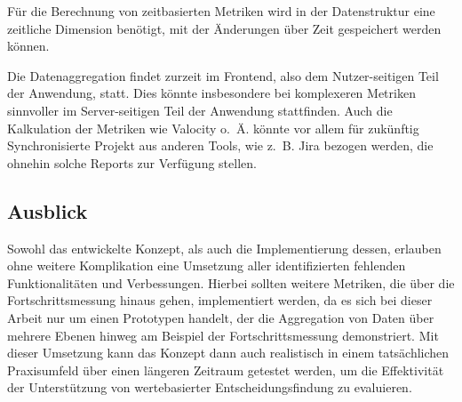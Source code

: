 Für die Berechnung von zeitbasierten Metriken wird in der Datenstruktur eine zeitliche Dimension benötigt, mit der Änderungen über Zeit gespeichert werden können.

Die Datenaggregation findet zurzeit im Frontend, also dem Nutzer-seitigen Teil der Anwendung, statt. Dies könnte insbesondere bei komplexeren Metriken sinnvoller im Server-seitigen Teil der Anwendung stattfinden. Auch die Kalkulation der Metriken wie Valocity o. Ä. könnte vor allem für zukünftig Synchronisierte Projekt aus anderen Tools, wie z. B. Jira bezogen werden, die ohnehin solche Reports zur Verfügung stellen.

\subsection{Ausblick}
Sowohl das entwickelte Konzept, als auch die Implementierung dessen, erlauben ohne weitere Komplikation eine Umsetzung aller identifizierten fehlenden Funktionalitäten und Verbessungen. Hierbei sollten weitere Metriken, die über die Fortschrittsmessung hinaus gehen, implementiert werden, da es sich bei dieser Arbeit nur um einen Prototypen handelt, der die Aggregation von Daten über mehrere Ebenen hinweg am Beispiel der Fortschrittsmessung demonstriert.
Mit dieser Umsetzung kann das Konzept dann auch realistisch in einem tatsächlichen Praxisumfeld über einen längeren Zeitraum getestet werden, um die Effektivität der Unterstützung von wertebasierter Entscheidungsfindung zu evaluieren.
